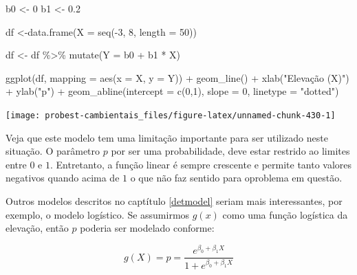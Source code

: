 \documentclass[
]{book}
\newenvironment{Shaded}{\begin{snugshade}}{\end{snugshade}}
\newcommand{\AttributeTok}[1]{\textcolor[rgb]{0.77,0.63,0.00}{#1}}
\newcommand{\DecValTok}[1]{\textcolor[rgb]{0.00,0.00,0.81}{#1}}
\newcommand{\FloatTok}[1]{\textcolor[rgb]{0.00,0.00,0.81}{#1}}
\newcommand{\FunctionTok}[1]{\textcolor[rgb]{0.00,0.00,0.00}{#1}}
\newcommand{\NormalTok}[1]{#1}
\newcommand{\OtherTok}[1]{\textcolor[rgb]{0.56,0.35,0.01}{#1}}
\newcommand{\SpecialCharTok}[1]{\textcolor[rgb]{0.00,0.00,0.00}{#1}}
\newcommand{\StringTok}[1]{\textcolor[rgb]{0.31,0.60,0.02}{#1}}
\begin{document}
\begin{Shaded}
\begin{Highlighting}[]
\NormalTok{b0 }\OtherTok{\textless{}{-}} \DecValTok{0}
\NormalTok{b1 }\OtherTok{\textless{}{-}} \FloatTok{0.2}

\NormalTok{df }\OtherTok{\textless{}{-}}\FunctionTok{data.frame}\NormalTok{(}\AttributeTok{X =} \FunctionTok{seq}\NormalTok{(}\SpecialCharTok{{-}}\DecValTok{3}\NormalTok{, }\DecValTok{8}\NormalTok{, }\AttributeTok{length =} \DecValTok{50}\NormalTok{))}

\NormalTok{df }\OtherTok{\textless{}{-}}\NormalTok{ df }\SpecialCharTok{\%\textgreater{}\%} \FunctionTok{mutate}\NormalTok{(}\AttributeTok{Y =}\NormalTok{ b0 }\SpecialCharTok{+}\NormalTok{ b1 }\SpecialCharTok{*}\NormalTok{ X)}

\FunctionTok{ggplot}\NormalTok{(df, }\AttributeTok{mapping =} \FunctionTok{aes}\NormalTok{(}\AttributeTok{x =}\NormalTok{ X, }\AttributeTok{y =}\NormalTok{ Y)) }\SpecialCharTok{+}
  \FunctionTok{geom\_line}\NormalTok{() }\SpecialCharTok{+}
  \FunctionTok{xlab}\NormalTok{(}\StringTok{"Elevação (X)"}\NormalTok{) }\SpecialCharTok{+}
  \FunctionTok{ylab}\NormalTok{(}\StringTok{"p"}\NormalTok{) }\SpecialCharTok{+}
  \FunctionTok{geom\_abline}\NormalTok{(}\AttributeTok{intercept =} \FunctionTok{c}\NormalTok{(}\DecValTok{0}\NormalTok{,}\DecValTok{1}\NormalTok{), }\AttributeTok{slope =} \DecValTok{0}\NormalTok{, }\AttributeTok{linetype =} \StringTok{"dotted"}\NormalTok{)}
\end{Highlighting}
\end{Shaded}

\begin{center}\texttt{[image: probest-cambientais\_files/figure-latex/unnamed-chunk-430-1]} \end{center}

Veja que este modelo tem uma limitação importante para ser utilizado neste situação. O parâmetro \(p\) por ser uma probabilidade, deve estar restrido ao limites entre \(0\) e \(1\). Entretanto, a função linear é sempre crescente e permite tanto valores negativos quando acima de \(1\) o que não faz sentido para oproblema em questão.

Outros modelos descritos no captítulo \ref{detmodel} seriam mais interessantes, por exemplo, o modelo logístico. Se assumirmos \(g(x)\) como uma função logística da elevação, então \(p\) poderia ser modelado conforme:

\[g(X) = p = \frac{e^{\beta_0 + \beta_1 X}}{1 + e^{\beta_0 + \beta_1 X}}\]
\end{document}
